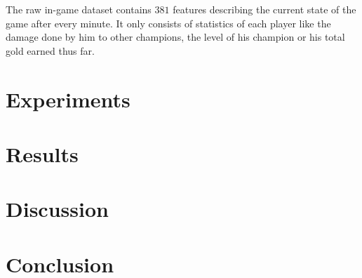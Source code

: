 \documentclass[12pt, a4paper, headinclude, twoside, plainheadsepline, open=right, numbers=noenddot, hidelinks, toc=listof, toc=bibliography]{scrreprt}
\begin{document}
The raw in-game dataset contains $381$ features describing the current state of the game after every minute.
It only consists of statistics of each player like the damage done by him to other champions, the level of his champion or his total gold earned thus far.




\chapter{Experiments}
\label{chap:experiments}

\chapter{Results}
\label{chap:results}


\chapter{Discussion}
\label{chap:discussion}


\chapter{Conclusion}
\label{chap:conclusion}

%
%
%
\printbibliography






\listoffigures																			%
\listoftables																			%
\cleardoublepage{}	%
\printacronyms[heading={chapter*}, name={List of Abbreviations}]
\end{document}

